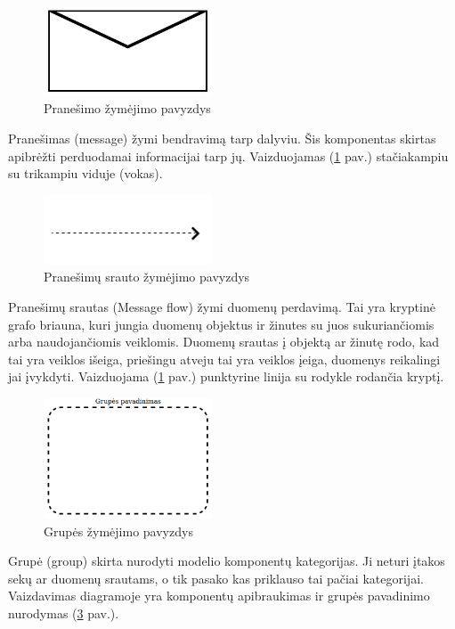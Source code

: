 \begin{figure}[H]
	\centering
	\includegraphics[width=5cm]{img/bpm-components/message}
	\caption{Pranešimo žymėjimo pavyzdys}
	\label{img:bpm_components_message}
\end{figure}

Pranešimas (message) žymi bendravimą tarp dalyviu. Šis komponentas skirtas apibrėžti perduodamai informacijai tarp jų. Vaizduojamas (\ref{img:bpm_components_message} pav.) stačiakampiu su trikampiu viduje (vokas).

\begin{figure}[H]
	\centering
	\includegraphics[width=5cm]{img/bpm-components/message_flow}
	\caption{Pranešimų srauto žymėjimo pavyzdys}
	\label{img:bpm_components_message_flow}
\end{figure}

Pranešimų srautas (Message flow) žymi duomenų perdavimą. Tai yra kryptinė grafo briauna, kuri jungia duomenų objektus ir žinutes su juos sukuriančiomis arba naudojančiomis veiklomis. Duomenų srautas į objektą ar žinutę rodo, kad tai yra veiklos išeiga, priešingu atveju tai yra veiklos įeiga, duomenys reikalingi jai įvykdyti. Vaizduojama (\ref{img:bpm_components_message} pav.) punktyrine linija su rodykle rodančia kryptį.

\begin{figure}[H]
	\centering
	\includegraphics[width=5cm]{img/bpm-components/group}
	\caption{Grupės žymėjimo pavyzdys}
	\label{img:bpm_components_group}
\end{figure}

Grupė (group) skirta nurodyti modelio komponentų kategorijas. Ji neturi įtakos sekų ar duomenų srautams, o tik pasako kas priklauso tai pačiai kategorijai. Vaizdavimas diagramoje yra komponentų apibraukimas ir grupės pavadinimo nurodymas (\ref{img:bpm_components_group} pav.).

